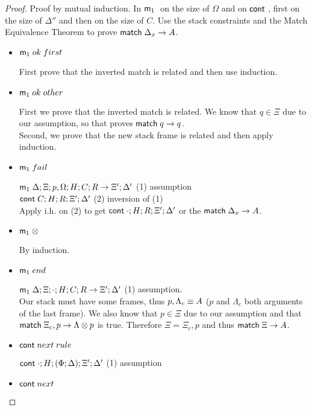 \begin{proof}

Proof by mutual induction. In $\mathsf{m}_1 \;$ on the size of $\Omega$ and on $\mathsf{cont} \;$, first on the size of $\Delta''$ and then on the size of $C$. Use the stack constraints and the Match Equivalence Theorem to prove $\mathsf{match} \; \Delta_x \rightarrow A$.

\begin{itemize}
   \item $\mathsf{m}_1 \; ok \; first$
   
   First prove that the inverted match is related and then use induction.
   
   \item $\mathsf{m}_1 \; ok \; other$
   
   First we prove that the inverted match is related. We know that $q \in \Xi$ due to our assumption, so that proves $\mathsf{match} \; q \rightarrow q$. \\
   Second, we prove that the new stack frame is related and then apply induction.
   
   \item $\mathsf{m}_1 \; fail$
   
   $\mathsf{m}_1 \; \Delta; \Xi; p, \Omega; H; C; R \rightarrow \Xi'; \Delta'$ \hfill (1) assumption \\
   $\mathsf{cont} \; C; H; R; \Xi'; \Delta'$ \hfill (2) inversion of (1) \\
   Apply i.h. on (2) to get $\mathsf{cont} \; \cdot; H; R; \Xi'; \Delta'$ or the $\mathsf{match} \; \Delta_x \rightarrow A$.
   
   \item $\mathsf{m}_1 \; \otimes$
   
   By induction.
   
   \item $\mathsf{m}_1 \; end$
   
   $\mathsf{m}_1 \; \Delta; \Xi; \cdot; H; C; R \rightarrow \Xi'; \Delta'$ \hfill (1) assumption.\\
   Our stack must have some frames, thus $p, \Lambda_c \equiv A$ ($p$ and $\Lambda_c$ both arguments of the last frame). We also know that $p \in \Xi$ due to our assumption and that $\mathsf{match} \; \Xi_c, p \rightarrow \Lambda \otimes p$ is true. Therefore $\Xi = \Xi_c, p$ and thus $\mathsf{match} \; \Xi \rightarrow A$.
   
   \item $\mathsf{cont} \; next \; rule$
   
   $\mathsf{cont} \; \cdot; H; (\Phi; \Delta); \Xi'; \Delta'$ \hfill (1) assumption \\
   
   \item $\mathsf{cont} \; next$
   

\end{itemize}
\end{proof}

